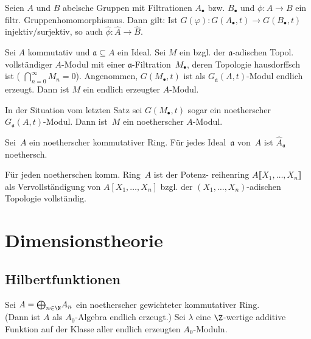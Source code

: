\documentclass{cheat-sheet}
\newcommand{\aaa}{\mathfrak{a}}
\begin{document}
\begin{lem}
  Seien $A$ und $B$ abelsche Gruppen mit Filtrationen $A_\bullet$ bzw. $B_\bullet$ und $\phi : A \to B$ ein filtr. Gruppenhomomorphismus.
  Dann gilt:
  Ist $G(\varphi) : G(A_\bullet, t) \to G(B_\bullet, t)$ injektiv/surjektiv, so auch $\hat{\phi} : \hat{A} \to \hat{B}$.
\end{lem}

\begin{prop}
  Sei $A$ kommutativ und $\aaa \subseteq A$ ein Ideal.
  Sei $M$ ein bzgl. der $\aaa$-adischen Topol. vollständiger $A$-Modul mit einer $\aaa$-Filtration~$M_\bullet$, deren Topologie hausdorffsch ist (\dh{} ${\bigcap}_{n=0}^\infty M_n = 0$).
  Angenommen, $G(M_\bullet, t)$ ist als $G_\aaa(A, t)$-Modul endlich erzeugt.
  Dann ist $M$ ein endlich erzeugter $A$-Modul.
\end{prop}

\begin{kor}
  In der Situation vom letzten Satz sei $G(M_\bullet, t)$ sogar ein noetherscher $G_\aaa(A, t)$-Modul.
  Dann ist~$M$ ein noetherscher $A$-Modul.
\end{kor}

\begin{satz}
  Sei~$A$ ein noetherscher kommutativer Ring.
  Für jedes Ideal~$\aaa$ von~$A$ ist $\hat{A}_\aaa$ noethersch.
\end{satz}

\begin{folgerung}
  Für jeden noetherschen komm. Ring~$A$ ist der Potenz- reihenring $A \llbracket X_1, \ldots, X_n \rrbracket$ als Vervollständigung von $A [X_1, \ldots, X_n]$ bzgl. der $(X_1, \ldots, X_n)$-adischen Topologie vollständig.
\end{folgerung}

\section{Dimensionstheorie}

\subsection{Hilbertfunktionen}


Sei $A = {\bigoplus}_{n \in \N} A_n$ ein noetherscher gewichteter kommutativer Ring. \\
(Dann ist $A$ als $A_0$-Algebra endlich erzeugt.)
Sei $\lambda$ eine $\Z$-wertige additive Funktion auf der Klasse aller endlich erzeugten $A_0$-Moduln.
\end{document}
